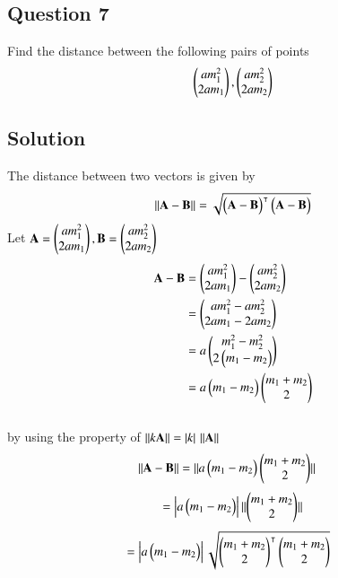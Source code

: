 \documentclass[journal,12pt,twocolumn]{IEEEtran}
\renewcommand\thesection{\arabic{section}}
\renewcommand\thesubsection{\thesection.\arabic{subsection}}
\renewcommand\thesubsubsection{\thesubsection.\arabic{subsubsection}}
\begin{document}
\subsection{Question 7}
\item 
{}
Find the distance between the following pairs of points
\begin{align}
\begin{pmatrix}am_1^2\\2am_1\end{pmatrix}, \begin{pmatrix}am_2^2\\2am_2\end{pmatrix}
\end{align}
\subsection{Solution}
\item The distance between two vectors is given by 
\begin{align}
\lVert\mathbf{A}-\mathbf{B}\rVert=\sqrt{\begin{pmatrix}\mathbf{A}-\mathbf{B}\end{pmatrix}^
\intercal \begin{pmatrix}\mathbf{A}-\mathbf{B}\end{pmatrix}}
\end{align}
Let $\mathbf{A}={\begin{pmatrix}am_1^2\\2am_1\end{pmatrix}, \mathbf{B}=\begin{pmatrix}am_2^2\\2am_2\end{pmatrix}}$
\begin{align}
\mathbf{A}-\mathbf{B}&=\begin{pmatrix}am_1^2\\2am_1\end{pmatrix}-\begin{pmatrix}am_2^2\\2am_2\end{pmatrix}
\\&=\begin{pmatrix}am_1^2-am_2^2\\2am_1-2am_2\end{pmatrix}
\\&=a\begin{pmatrix}m_1^2-m_2^2\\2\begin{pmatrix}m_1-m_2\end{pmatrix}\end{pmatrix}
\\&=a\begin{pmatrix}m_1-m_2\end{pmatrix}\begin{pmatrix}m_1+m_2\\2\end{pmatrix}
\end{align}
\\by using the property of $\lVert k\mathbf{A}\rVert=\left\vert k\right\vert \,\lVert\mathbf{A}\rVert$
\begin{align}
\lVert\mathbf{A}-\mathbf{B}\rVert&=\lVert a\begin{pmatrix}m_1-m_2\end{pmatrix}\begin{pmatrix}m_1+m_2\\2\end{pmatrix}\rVert
\end{align}
\begin{align}
=\left\vert a\begin{pmatrix}m_1-m_2\end{pmatrix}\right\vert\lVert\begin{pmatrix}m_1+m_2\\2\end{pmatrix}\rVert
\end{align}
\begin{align}
&=\left\vert a\begin{pmatrix}m_1-m_2\end{pmatrix}\right\vert\sqrt{\begin{pmatrix}m_1+m_2\\2\end{pmatrix}^
\intercal\begin{pmatrix}m_1+m_2\\2\end{pmatrix}}
\end{align}
\end{document}
